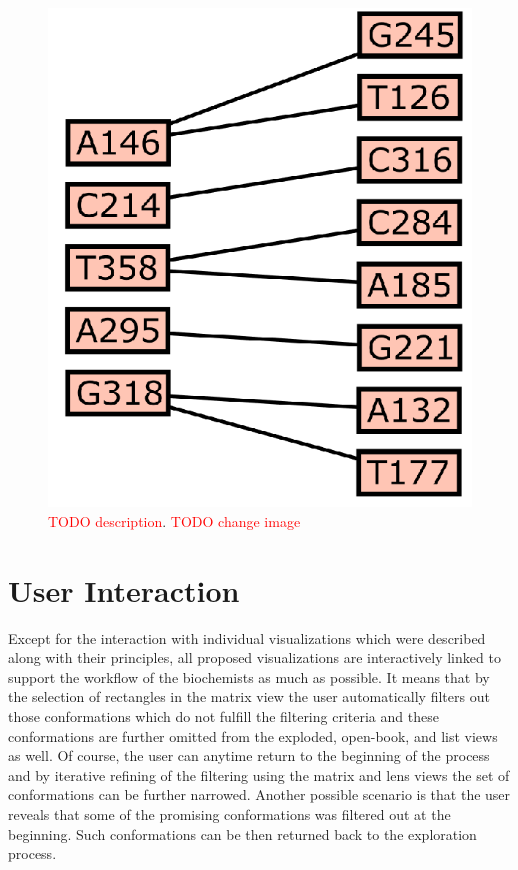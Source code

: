 \documentclass[journal]{vgtc}                %
\begin{document}
\begin{figure}[bt]
  \centering
  \includegraphics[width=0.8\columnwidth]{list.png}
  \caption{\textcolor{red}{TODO description}. \textcolor{red}{TODO change image}}
  \label{fig:list}
\end{figure}

\section{User Interaction}
Except for the interaction with individual visualizations which were described along with their principles, all proposed visualizations are interactively linked to support the workflow of the biochemists as much as possible.
It means that by the selection of rectangles in the matrix view the user automatically filters out those conformations which do not fulfill the filtering criteria and these conformations are further omitted from the exploded, open-book, and list views as well.
Of course, the user can anytime return to the beginning of the process and by iterative refining of the filtering using the matrix and lens views the set of conformations can be further narrowed.
Another possible scenario is that the user reveals that some of the promising conformations was filtered out at the beginning.
Such conformations can be then returned back to the exploration process.
\end{document}

